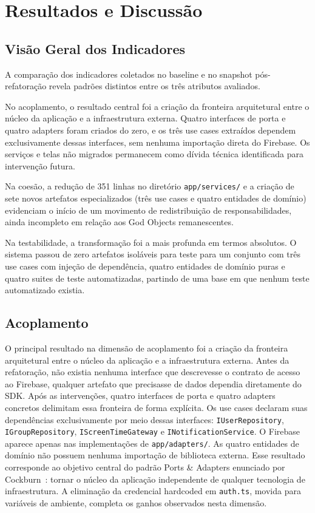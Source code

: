 \documentclass[sigconf,anonymous]{acmart}
\begin{document}
\section{Resultados e Discussão}

\subsection{Visão Geral dos Indicadores}

A comparação dos indicadores coletados no baseline e no snapshot pós-refatoração revela padrões distintos entre os três atributos avaliados.

No acoplamento, o resultado central foi a criação da fronteira arquitetural entre o núcleo da aplicação e a infraestrutura externa. Quatro interfaces de porta e quatro adapters foram criados do zero, e os três use cases extraídos dependem exclusivamente dessas interfaces, sem nenhuma importação direta do Firebase. Os serviços e telas não migrados permanecem como dívida técnica identificada para intervenção futura.

Na coesão, a redução de 351 linhas no diretório \texttt{app/services/} e a criação de sete novos artefatos especializados (três use cases e quatro entidades de domínio) evidenciam o início de um movimento de redistribuição de responsabilidades, ainda incompleto em relação aos God Objects remanescentes.

Na testabilidade, a transformação foi a mais profunda em termos absolutos. O sistema passou de zero artefatos isoláveis para teste para um conjunto com três use cases com injeção de dependência, quatro entidades de domínio puras e quatro suites de teste automatizadas, partindo de uma base em que nenhum teste automatizado existia.

\subsection{Acoplamento}

O principal resultado na dimensão de acoplamento foi a criação da fronteira arquitetural entre o núcleo da aplicação e a infraestrutura externa. Antes da refatoração, não existia nenhuma interface que descrevesse o contrato de acesso ao Firebase, qualquer artefato que precisasse de dados dependia diretamente do SDK. Após as intervenções, quatro interfaces de porta e quatro adapters concretos delimitam essa fronteira de forma explícita. Os use cases declaram suas dependências exclusivamente por meio dessas interfaces: \texttt{IUserRepository}, \texttt{IGroupRepository}, \texttt{IScreenTimeGateway} e \texttt{INotificationService}. O Firebase aparece apenas nas implementações de \texttt{app/adapters/}. As quatro entidades de domínio não possuem nenhuma importação de biblioteca externa. Esse resultado corresponde ao objetivo central do padrão Ports \& Adapters enunciado por Cockburn~\cite{Cockburn2005}: tornar o núcleo da aplicação independente de qualquer tecnologia de infraestrutura. A eliminação da credencial hardcoded em \texttt{auth.ts}, movida para variáveis de ambiente, completa os ganhos observados nesta dimensão.
\end{document}
